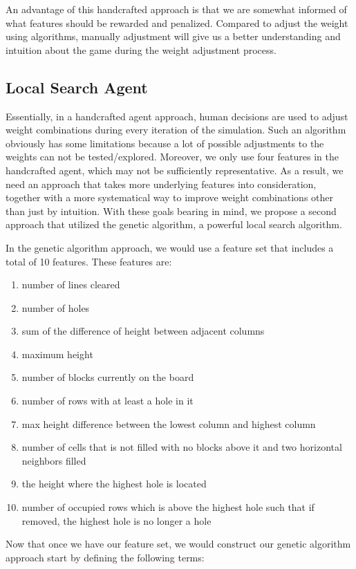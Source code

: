 \documentclass[letterpaper]{article} %
\begin{document}
An advantage of this handcrafted approach is that we are somewhat informed of what features should be rewarded and penalized. Compared to adjust the weight using algorithms, manually adjustment will give us a better understanding and intuition about the game during the weight adjustment process.
\subsection{Local Search Agent}
Essentially, in a handcrafted agent approach, human decisions are used to adjust weight combinations during every iteration of the simulation. Such an algorithm obviously has some limitations because a lot of possible adjustments to the weights can not be tested/explored. Moreover, we only use four features in the handcrafted agent, which may not be sufficiently representative. As a result, we need an approach that takes more underlying features into consideration, together with a more systematical way to improve weight combinations other than just by intuition. With these goals bearing in mind, we propose a second approach that utilized the genetic algorithm, a powerful local search algorithm.

In the genetic algorithm approach, we would use a feature set that includes a total of 10 features. These features are:
\begin{enumerate}
 \item number of lines cleared
 \item number of holes
 \item sum of the difference of height between adjacent columns
 \item maximum height
 \item number of blocks currently on the board
 \item number of rows with at least a hole in it
 \item max height difference between the lowest column and highest column
 \item number of cells that is not filled with no blocks above it and two horizontal neighbors filled
 \item the height where the highest hole is located
 \item number of occupied rows which is above the highest hole such that if removed, the highest hole is no longer a hole
\end{enumerate}

Now that once we have our feature set, we would construct our genetic algorithm approach start by defining the following terms:
\end{document}
